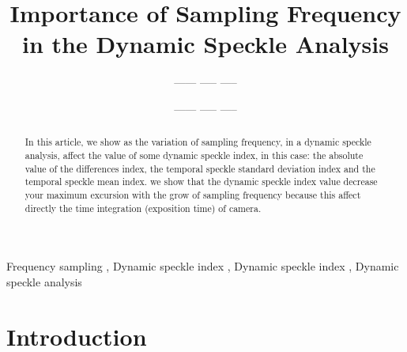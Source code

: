 \documentclass[review]{elsarticle}
\begin{document}
 

\begin{frontmatter}

\title{Importance of Sampling Frequency in the Dynamic Speckle Analysis}



\author{------ ----- -----}
\author{------ ----- -----}



\address{University Federal of Lavras, Lavras, Brazil}
% 


\begin{abstract}
In this article, we show as the variation of sampling frequency, 
in a dynamic speckle analysis, affect the value of some dynamic speckle index, 
in this case: the absolute value of the differences index, the temporal 
speckle standard deviation index and the temporal 
speckle mean index.
we show that  the dynamic speckle index value decrease your maximum excursion with 
the grow of sampling frequency because this affect directly the time integration 
(exposition time) of camera.
\end{abstract}

\begin{keyword}
Frequency sampling \sep
Dynamic speckle index \sep 
Dynamic speckle index \sep 
Dynamic speckle analysis
\end{keyword}

\end{frontmatter}

\linenumbers


\section{Introduction}


\end{document}
